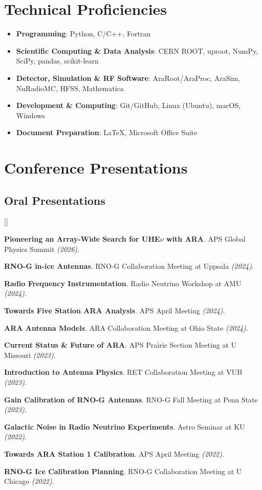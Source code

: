 \documentclass[10pt,letterpaper]{report}
\newcommand{\cvdate}[1]{{\normalfont\itshape\color{Muted}(#1)}}
\newcounter{cvitemrank}
\newenvironment{cvnumbered}[1]{%
  \setcounter{cvitemrank}{#1}%
  \begin{list}{\textcolor{Muted}{[\arabic{cvitemrank}]}}{%
    \setlength{\leftmargin}{2.25em}\setlength{\labelwidth}{1.65em}
    \setlength{\labelsep}{0.45em}\setlength{\itemindent}{0pt}
    \setlength{\itemsep}{0.3pt}\setlength{\topsep}{1.5pt}
    \setlength{\parsep}{0pt}\setlength{\partopsep}{0pt}}%
}{\end{list}}
\newcommand{\cvnumitem}{\item\addtocounter{cvitemrank}{-1}}
\begin{document}
\section*{Technical Proficiencies}
\begin{itemize}
    \item \textbf{Programming}: Python, C/C++, Fortran
    \item \textbf{Scientific Computing \& Data Analysis}: CERN ROOT, uproot, NumPy, SciPy, pandas, scikit-learn
    \item \textbf{Detector, Simulation \& RF Software}: AraRoot/AraProc, AraSim, NuRadioMC, HFSS, Mathematica
    \item \textbf{Development \& Computing}: Git/GitHub, Linux (Ubuntu), macOS, Windows
    \item \textbf{Document Preparation}: \LaTeX, Microsoft Office Suite
\end{itemize}

\section*{Conference Presentations}
\subsection*{Oral Presentations}
\begin{cvnumbered}{11}

    \cvnumitem \textbf{Pioneering an Array-Wide Search for UHE$\nu$ with ARA}. APS Global Physics Summit \cvdate{2026}.

    \cvnumitem \textbf{RNO-G in-ice Antennas}. RNO-G Collaboration Meeting at Uppsala \cvdate{2024}.
    
    \cvnumitem \textbf{Radio Frequency Instrumentation}. Radio Neutrino Workshop at AMU \cvdate{2024}.
    
    \cvnumitem \textbf{Towards Five Station ARA Analysis}. APS April Meeting \cvdate{2024}.

    \cvnumitem \textbf{ARA Antenna Models}. ARA Collaboration Meeting at Ohio State \cvdate{2024}.
    
    \cvnumitem \textbf{Current Status \& Future of ARA}. APS Prairie Section Meeting at  U Missouri \cvdate{2023}.
    
    \cvnumitem \textbf{Introduction to Antenna Physics}. RET Collaboration Meeting at VUB \cvdate{2023}.
    
    \cvnumitem \textbf{Gain Calibration of RNO-G Antennas}. RNO-G Fall Meeting at Penn State \cvdate{2023}.

    \cvnumitem \textbf{Galactic Noise in Radio Neutrino Experiments}. Astro Seminar at KU \cvdate{2022}.
    
    \cvnumitem \textbf{Towards ARA Station 1 Calibration}. APS April Meeting \cvdate{2022}.
    
    \cvnumitem \textbf{RNO-G Ice Calibration Planning}. RNO-G Collaboration Meeting at U Chicago \cvdate{2022}.
\end{cvnumbered}
\pagebreak
\end{document}

